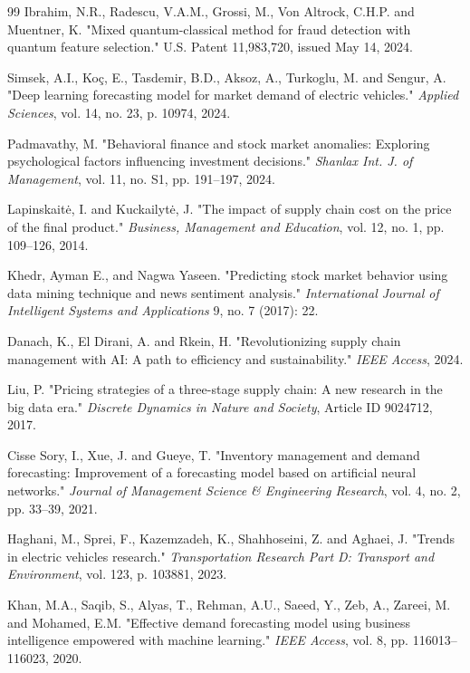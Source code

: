 \documentclass[pdflatex,sn-mathphys-num]{sn-jnl}%
\begin{document}
\begin{thebibliography}{99}
Ibrahim, N.R., Radescu, V.A.M., Grossi, M., Von Altrock, C.H.P. and Muentner, K.
"Mixed quantum-classical method for fraud detection with quantum feature selection."
U.S. Patent 11,983,720, issued May 14, 2024.

Simsek, A.I., Koç, E., Tasdemir, B.D., Aksoz, A., Turkoglu, M. and Sengur, A.
"Deep learning forecasting model for market demand of electric vehicles."
\textit{Applied Sciences}, vol. 14, no. 23, p. 10974, 2024.

Padmavathy, M.
"Behavioral finance and stock market anomalies: Exploring psychological factors influencing investment decisions."
\textit{Shanlax Int. J. of Management}, vol. 11, no. S1, pp. 191–197, 2024.

Lapinskaitė, I. and Kuckailytė, J.
"The impact of supply chain cost on the price of the final product."
\textit{Business, Management and Education}, vol. 12, no. 1, pp. 109–126, 2014.

Khedr, Ayman E., and Nagwa Yaseen.
"Predicting stock market behavior using data mining technique and news sentiment analysis."
\textit{International Journal of Intelligent Systems and Applications} 9, no. 7 (2017): 22.

Danach, K., El Dirani, A. and Rkein, H.
"Revolutionizing supply chain management with AI: A path to efficiency and sustainability."
\textit{IEEE Access}, 2024.

Liu, P.
"Pricing strategies of a three-stage supply chain: A new research in the big data era."
\textit{Discrete Dynamics in Nature and Society}, Article ID 9024712, 2017.

Cisse Sory, I., Xue, J. and Gueye, T.
"Inventory management and demand forecasting: Improvement of a forecasting model based on artificial neural networks."
\textit{Journal of Management Science \& Engineering Research}, vol. 4, no. 2, pp. 33–39, 2021.

Haghani, M., Sprei, F., Kazemzadeh, K., Shahhoseini, Z. and Aghaei, J.
"Trends in electric vehicles research."
\textit{Transportation Research Part D: Transport and Environment}, vol. 123, p. 103881, 2023.

Khan, M.A., Saqib, S., Alyas, T., Rehman, A.U., Saeed, Y., Zeb, A., Zareei, M. and Mohamed, E.M.
"Effective demand forecasting model using business intelligence empowered with machine learning."
\textit{IEEE Access}, vol. 8, pp. 116013–116023, 2020.


\end{thebibliography}
\end{document}
